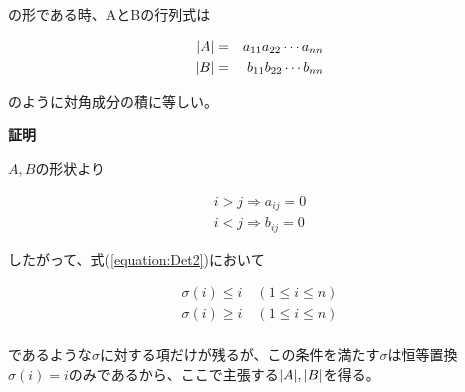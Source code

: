 \documentclass[dvipdfmx,autodetect-engine]{jsarticle}
\DeclarePairedDelimiter{\abs}{\lvert}{\rvert}
\begin{document}
の形である時、AとBの行列式は

\begin{eqnarray*}
\abs{A} &= &a_{11}a_{22} \cdots a_{nn} \\
\abs{B} &= &b_{11}b_{22} \cdots b_{nn}
\end{eqnarray*}

のように対角成分の積に等しい。

{\bf 証明}

$A, B$の形状より

\begin{eqnarray*}
i > j \Longrightarrow a_{ij} = 0 \\
i < j \Longrightarrow b_{ij} = 0
\end{eqnarray*}

したがって、式(\ref{equation:Det2})において

\begin{eqnarray*}
\sigma(i) \leq i \quad (1 \leq i \leq n) \\
\sigma(i) \geq i \quad (1 \leq i \leq n) \\
\end{eqnarray*}

であるような$\sigma$に対する項だけが残るが、この条件を満たす$\sigma$は恒等置換$\sigma(i) = i$のみであるから、ここで主張する$\abs{A}, \abs{B}$を得る。
\end{document}

